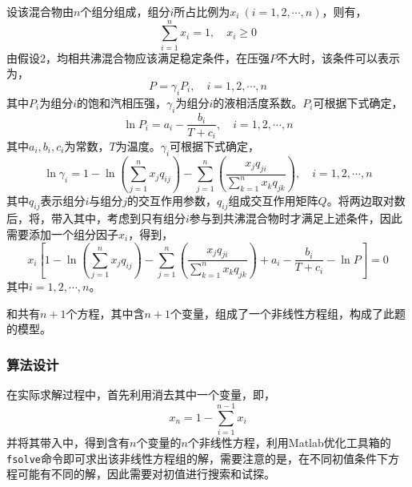 \documentclass[12pt,a4paper]{article}
\begin{document}
设该混合物由$n$个组分组成，组分$i$所占比例为$x_i\ (i=1,2,\cdots,n)$，则有，
\begin{equation}\label{eq:ex6_component}
    \sum_{i=1}^n x_i = 1, \quad x_i \ge 0
\end{equation}
由假设2，均相共沸混合物应该满足稳定条件，在压强$P$不大时，该条件可以表示为，
\begin{equation}\label{eq:ex6_pressure}
    P = \gamma_i P_i, \quad i=1,2,\cdots,n
\end{equation}
其中$P_i$为组分$i$的饱和汽相压强，$\gamma_i$为组分$i$的液相活度系数。$P_i$可根据下式确定，
\begin{equation}\label{eq:ex6_log_pressure}
    \ln P_i = a_i - \frac{b_i}{T + c_i}, \quad i = 1,2,\cdots,n
\end{equation}
其中$a_i,b_i,c_i$为常数，$T$为温度。$\gamma_i$可根据下式确定，
\begin{equation}\label{eq:ex6_log_gamma}
    \ln \gamma_i = 1 - \ln\left(\sum_{j=1}^n x_j q_{ij}\right) - \sum_{j=1}^n\left(\frac{x_j q_{ji}}{\sum_{k=1}^n x_k q_{jk}}\right),\quad i=1,2,\cdots,n
\end{equation}
其中$q_{ij}$表示组分$i$与组分$j$的交互作用参数，$q_{ij}$组成交互作用矩阵$Q$。将两边取对数后，将，带入其中，考虑到只有组分$i$参与到共沸混合物时才满足上述条件，因此需要添加一个组分因子$x_i$，得到，
\begin{equation}\label{eq:ex6_system}
    x_i\left[1 - \ln\left(\sum_{j=1}^n x_j q_{ij}\right) - \sum_{j=1}^n\left(\frac{x_j q_{ji}}{\sum_{k=1}^n x_k q_{jk}}\right) + a_i - \frac{b_i}{T + c_i} - \ln P\right] = 0
\end{equation}
其中$i=1,2,\cdots,n$。

和共有$n+1$个方程，其中含$n+1$个变量，组成了一个非线性方程组，构成了此题的模型。

\subsubsection{算法设计}

在实际求解过程中，首先利用消去其中一个变量，即，
\begin{equation}
    x_n = 1 - \sum_{i=1}^{n-1} x_i
\end{equation}
并将其带入中，得到含有$n$个变量的$n$个非线性方程，利用Matlab优化工具箱的\texttt{fsolve}命令即可求出该非线性方程组的解，需要注意的是，在不同初值条件下方程可能有不同的解，因此需要对初值进行搜索和试探。
\end{document}
